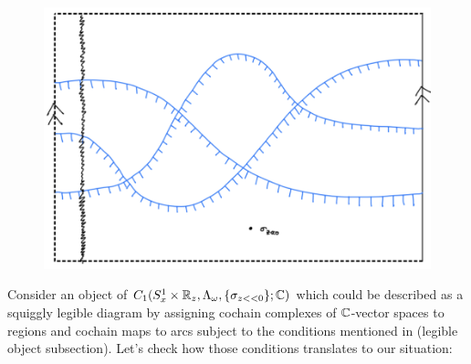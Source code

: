 \begin{figure}[H] 
    \centering
    \includegraphics[scale = 0.95]{diagrams/intro/8.png}
    \caption{}
    \label{fig:your-label}
\end{figure}
Consider an object of $C_1(S^1_x \times \mathbb{R}_z, \Lambda_\omega, \{\sigma_{z<<0}\};\mathbb{C})$ which could be described as a squiggly legible diagram by assigning cochain complexes of $\mathbb{C}$-vector spaces to regions and cochain maps to arcs subject to the conditions mentioned in (legible object subsection). Let's check how those conditions translates to our situation:
